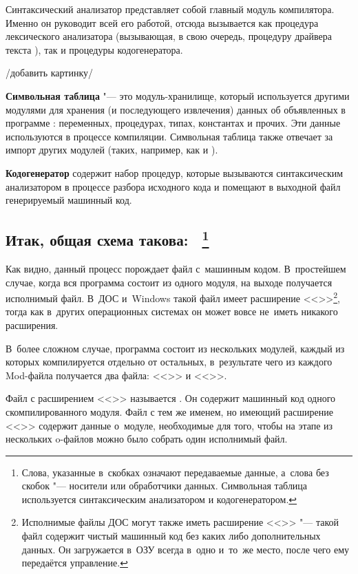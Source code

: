 

Синтаксический анализатор представляет собой главный модуль компилятора.
Именно он руководит всей его работой, отсюда вызывается как процедура
лексического анализатора  (вызывающая, в свою очередь, процедуру
драйвера текста ), так и процедуры кодогенератора.

/добавить картинку/

{\bfseries Символьная таблица} "--- это модуль-хранилище, который
используется другими модулями для хранения (и последующего извлечения)
данных об объявленных в программе : переменных, процедурах,
типах, константах и прочих. Эти данные используются в процессе компиляции.
Символьная таблица также отвечает за импорт других модулей (таких,
например, как  и ).

{\bfseries Кодогенератор} содержит набор процедур, которые вызываются
синтаксическим анализатором в процессе разбора исходного кода и
помещают в выходной файл генерируемый машинный код.

\subsection*{Итак, общая схема такова:\ \protect
\footnote{Слова, указанные в~скобках означают передаваемые данные,
а~слова без скобок "--- носители или обработчики данных. Символьная
таблица используется синтаксическим анализатором и кодогенератором.}}

\begin{center}
\end{center}

Как видно, данный процесс порождает файл с~машинным кодом.
В~простейшем случае, когда вся программа состоит из одного модуля,
на выходе получается исполнимый файл. В~ДОС и~Windows
такой файл имеет расширение
<<>>\footnote{Исполнимые файлы ДОС могут также иметь
расширение <<>> "--- такой файл содержит чистый машинный код
без каких либо дополнительных данных. Он загружается в~ОЗУ всегда
в~одно и~то~же место, после чего ему передаётся управление.}, тогда
как в~других операционных системах он может вовсе не~иметь никакого
расширения.

В~более сложном случае, программа состоит из нескольких модулей, каждый
из которых компилируется отдельно от остальных, в~результате чего из
каждого Mod-файла получается два файла:
<<>> и <<>>.

Файл с расширением <<>> называется .
Он содержит машинный код одного скомпилированного модуля.
Файл с тем же именем, но имеющий расширение <<>> содержит
данные о~модуле, необходимые для того, чтобы на этапе  из
нескольких o-файлов можно было собрать один исполнимый файл.

\newpage
